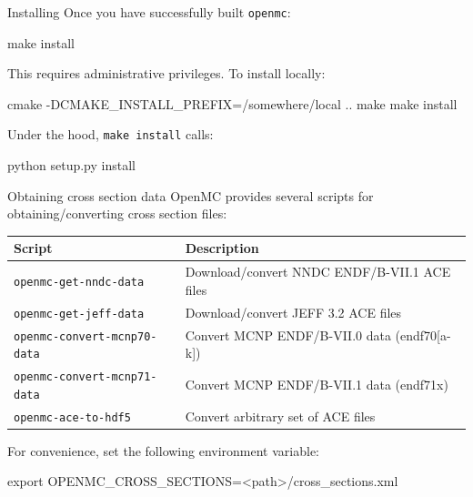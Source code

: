 \documentclass[noamssymb,svgnames]{beamer}
\begin{document}
\begin{frame}[fragile]{Installing}
  Once you have successfully built \textcolor{green!60!black}{\texttt{openmc}}:
  \begin{shell}
    make install
  \end{shell}
  This requires administrative privileges. To install locally:
  \begin{shell}
    cmake -DCMAKE_INSTALL_PREFIX=/somewhere/local ..
    make
    make install
  \end{shell}
  Under the hood, \texttt{make install} calls:
  \begin{shell}
    python setup.py install
  \end{shell}
\end{frame}

\begin{frame}[fragile]{Obtaining cross section data}
  OpenMC provides several scripts for obtaining/converting cross section files:
  \begin{table}
    \centering
    \scriptsize{
    \begin{tabular}{ll}
      \toprule
      \textbf{Script} & \textbf{Description} \\
      \midrule
      \texttt{openmc-get-nndc-data} & Download/convert NNDC ENDF/B-VII.1 ACE files \\
      \texttt{openmc-get-jeff-data} & Download/convert JEFF 3.2 ACE files \\
      \texttt{openmc-convert-mcnp70-data} & Convert MCNP ENDF/B-VII.0 data (endf70[a-k]) \\
      \texttt{openmc-convert-mcnp71-data} & Convert MCNP ENDF/B-VII.1 data (endf71x) \\
      \texttt{openmc-ace-to-hdf5} & Convert arbitrary set of ACE files \\
      \bottomrule
    \end{tabular}
    }
  \end{table}
  \vfill
  For convenience, set the following environment variable:
  \begin{shell}[minted options={fontsize=\scriptsize}]
    export OPENMC_CROSS_SECTIONS=<path>/cross_sections.xml
  \end{shell}
\end{frame}
\end{document}
